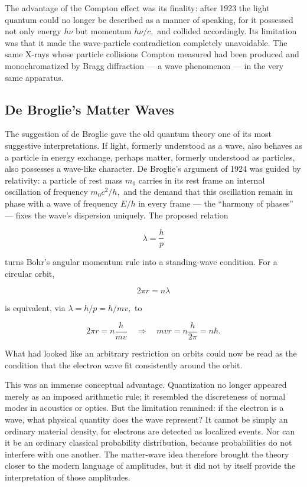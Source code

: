 The advantage of the Compton effect was its finality: after 1923 the light quantum could no longer be described as a manner of speaking, for it possessed not only energy $h\nu$ but momentum $h\nu/c,$ and collided accordingly. Its limitation was that it made the wave-particle contradiction completely unavoidable. The same X-rays whose particle collisions Compton measured had been produced and monochromatized by Bragg diffraction --- a wave phenomenon --- in the very same apparatus.

\subsection{De Broglie's Matter Waves}
\label{subsec:debroglie}
The suggestion of de Broglie gave the old quantum theory one of its most suggestive interpretations. If light, formerly understood as a wave, also behaves as a particle in energy exchange, perhaps matter, formerly understood as particles, also possesses a wave-like character. De Broglie's argument of 1924 was guided by relativity: a particle of rest mass $m_0$ carries in its rest frame an internal oscillation of frequency $m_0c^2/h,$ and the demand that this oscillation remain in phase with a wave of frequency $E/h$ in every frame --- the ``harmony of phases'' --- fixes the wave's dispersion uniquely. The proposed relation
\begin{linenomath}
    \begin{equation}
        \lambda=\frac{h}{p}
    \end{equation}
\end{linenomath}
turns Bohr's angular momentum rule into a standing-wave condition. For a circular orbit,
\begin{linenomath}
    \begin{equation}
        2\pi r=n\lambda
    \end{equation}
\end{linenomath}
is equivalent, via $\lambda=h/p=h/mv,$ to
\begin{linenomath}
    \begin{equation}
        2\pi r=n\frac{h}{mv}\quad\Longrightarrow\quad mvr=n\frac{h}{2\pi}=n\hbar.
    \end{equation}
\end{linenomath}
What had looked like an arbitrary restriction on orbits could now be read as the condition that the electron wave fit consistently around the orbit.

This was an immense conceptual advantage. Quantization no longer appeared merely as an imposed arithmetic rule; it resembled the discreteness of normal modes in acoustics or optics. But the limitation remained: if the electron is a wave, what physical quantity does the wave represent? It cannot be simply an ordinary material density, for electrons are detected as localized events. Nor can it be an ordinary classical probability distribution, because probabilities do not interfere with one another. The matter-wave idea therefore brought the theory closer to the modern language of amplitudes, but it did not by itself provide the interpretation of those amplitudes.

